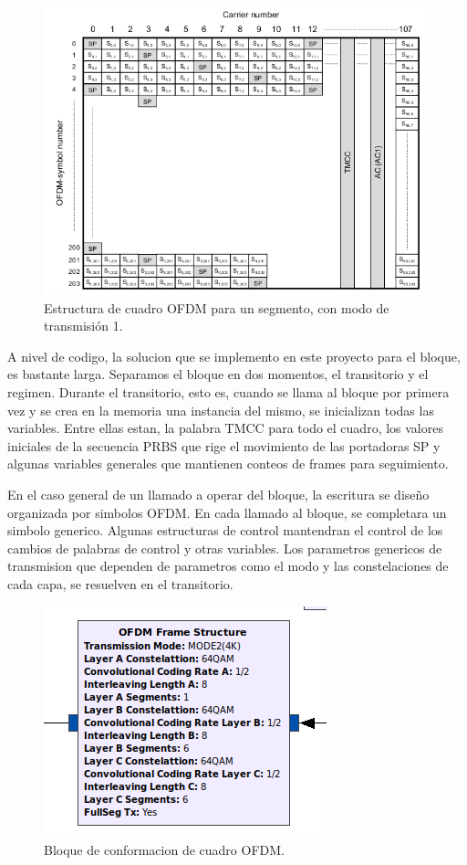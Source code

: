 \begin{figure}[!h]
	\centering
	\includegraphics[scale=0.5]{figuras/cap05/ofdm_frame}
	\caption{\label{f:ofdm_frame} Estructura de cuadro OFDM para un segmento, con modo de transmisión 1.}
\end{figure}

A nivel de codigo, la solucion que se implemento en este proyecto para el bloque, es bastante larga. Separamos el bloque en dos momentos, el transitorio y el regimen. Durante el transitorio, esto es, cuando se llama al bloque por primera vez y se crea en la memoria una instancia del mismo, se inicializan todas las variables. Entre ellas estan, la palabra TMCC para todo el cuadro, los valores iniciales de la secuencia PRBS que rige el movimiento de las portadoras SP y algunas variables generales que mantienen conteos de frames para seguimiento. 

En el caso general de un llamado a operar del bloque, la escritura se diseño organizada por simbolos OFDM. En cada llamado al bloque, se completara un simbolo generico. Algunas estructuras de control mantendran el control de los cambios de palabras de control y otras variables. Los parametros genericos de transmision que dependen de parametros como el modo y las constelaciones de cada capa, se resuelven en el transitorio.

\begin{figure}[!h]
	\centering
	\includegraphics[scale=0.5]{figuras/cap05/bloque_ofdm}
	\caption{\label{f:bloque_ofdm} Bloque de conformacion de cuadro OFDM.}
\end{figure}

